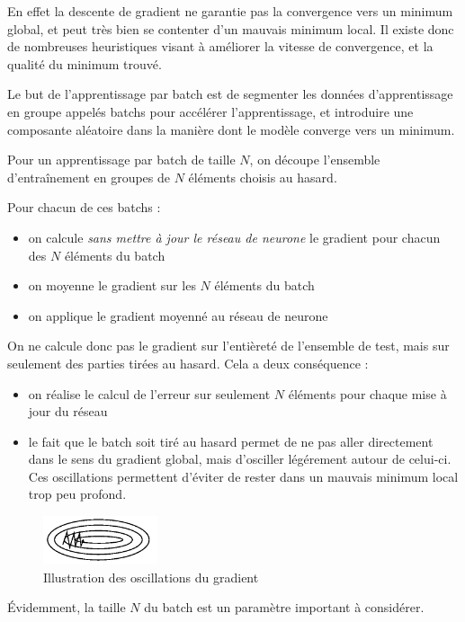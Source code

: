En effet la descente de gradient ne garantie pas la convergence vers un minimum global, et peut très bien se contenter d'un mauvais minimum local.
Il existe donc de nombreuses heuristiques visant à améliorer la vitesse de convergence, et la qualité du minimum trouvé.

Le but de l'apprentissage par batch est de segmenter les données d'apprentissage en groupe appelés batchs pour accélérer l'apprentissage, et introduire une 
composante aléatoire dans la manière dont le modèle converge vers un minimum.

Pour un apprentissage par batch de taille $N$, on découpe l'ensemble d'entraînement en groupes de $N$ éléments choisis au hasard.

Pour chacun de ces batchs :
\begin{itemize}
 \item on calcule \emph{sans mettre à jour le réseau de neurone} le gradient pour chacun des $N$ éléments du batch
 \item on moyenne le gradient sur les $N$ éléments du batch
 \item on applique le gradient moyenné au réseau de neurone
\end{itemize}

On ne calcule donc pas le gradient sur l’entièreté de l'ensemble de test, mais sur seulement des parties tirées au hasard.
Cela a deux conséquence : 
\begin{itemize}
 \item on réalise le calcul de l'erreur sur seulement $N$ éléments pour chaque mise à jour du réseau
 \item le fait que le batch soit tiré au hasard permet de ne pas aller directement dans le sens du gradient global, mais d'osciller légérement autour de celui-ci.
 Ces oscillations permettent d'éviter de rester dans un mauvais minimum local trop peu profond.
\end{itemize}

\begin{figure}[h]
 \centering
 \includegraphics[width=0.3\textwidth]{img/oscillations_stochastique.png}
 \caption{Illustration des oscillations du gradient}
 \label{fig:oscillations_stochastique.png}
\end{figure}

Évidemment, la taille $N$ du batch est un paramètre important à considérer. 


